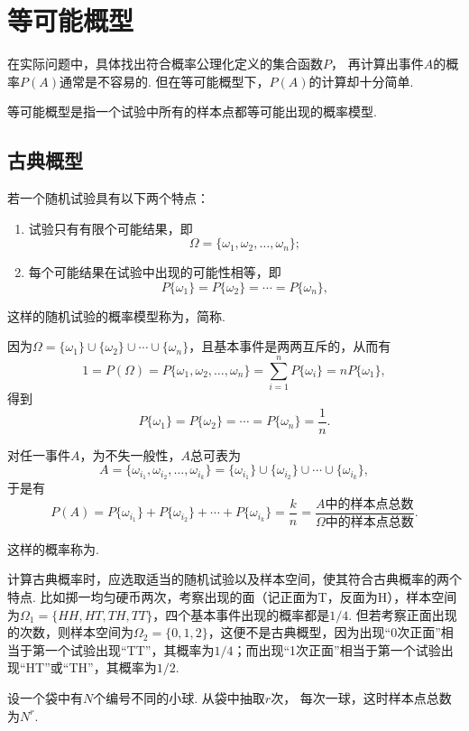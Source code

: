 \section{等可能概型}
在实际问题中，具体找出符合概率公理化定义的集合函数\(P\)，
再计算出事件\(A\)的概率\(P(A)\)通常是不容易的.
但在等可能概型下，\(P(A)\)的计算却十分简单.

等可能概型是指一个试验中所有的样本点都等可能出现的概率模型.
\subsection{古典概型}
\begin{definition}
若一个随机试验具有以下两个特点：
\begin{enumerate}
\item 试验只有有限个可能结果，即\[
\Omega = \{\omega_1, \omega_2, \dotsc, \omega_n\};
\]

\item 每个可能结果在试验中出现的可能性相等，即\[
P\{\omega_1\} = P\{\omega_2\} = \dotsb = P\{\omega_n\},
\]
\end{enumerate}
这样的随机试验的概率模型称为，简称.
\end{definition}

因为\(\Omega = \{\omega_1\}\cup\{\omega_2\}\cup\dotsb\cup\{\omega_n\}\)，且基本事件是两两互斥的，从而有\[
1 = P(\Omega) = P\{\omega_1, \omega_2, \dotsc, \omega_n\}
= \sum\limits_{i=1}^n P\{\omega_i\}
= n P\{\omega_1\},
\]得到\[
P\{\omega_1\} = P\{\omega_2\} = \dotsb = P\{\omega_n\} = \frac{1}{n}.
\]

对任一事件\(A\)，为不失一般性，\(A\)总可表为\[
A = \{\omega_{i_1},\omega_{i_2},\dotsc,\omega_{i_k}\}
= \{\omega_{i_1}\}\cup\{\omega_{i_2}\}\cup\dotsb\cup\{\omega_{i_k}\},
\]于是有\[
P(A) = P\{\omega_{i_1}\} + P\{\omega_{i_2}\} + \dotsb + P\{\omega_{i_k}\}
= \frac{k}{n} = \frac{A \text{中的样本点总数}}{\Omega \text{中的样本点总数}}.
\]

这样的概率称为.

计算古典概率时，应选取适当的随机试验以及样本空间，使其符合古典概率的两个特点.
比如掷一均匀硬币两次，考察出现的面（记正面为T，反面为H），样本空间为\(\Omega_1 = \{ HH, HT, TH, TT \}\)，四个基本事件出现的概率都是\(1/4\).
但若考察正面出现的次数，则样本空间为\(\Omega_2 = \{ 0,1,2 \}\)，这便不是古典概型，因为出现“0次正面”相当于第一个试验出现“TT”，其概率为\(1/4\)；而出现“1次正面”相当于第一个试验出现“HT”或“TH”，其概率为\(1/2\).

\begin{example}
设一个袋中有\(N\)个编号不同的小球.
从袋中抽取\(r\)次，
每次一球，这时样本点总数为\(N^r\).
\end{example}

